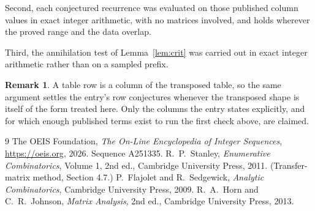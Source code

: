 \documentclass[11pt,a4paper]{article}
\theoremstyle{plain}
\theoremstyle{definition}
\newtheorem{remark}[theorem]{Remark}
\begin{document}
Second, each conjectured recurrence was evaluated on those published column values in exact
integer arithmetic, with no matrices involved, and holds wherever the proved range and the
data overlap.

Third, the annihilation test of Lemma~\ref{lem:crit} was carried out in exact integer
arithmetic rather than on a sampled prefix.

\begin{remark}
A table row is a column of the transposed table, so the same argument settles the entry's row
conjectures whenever the transposed shape is itself of the form treated here. Only the columns
the entry states explicitly, and for which enough published terms exist to run the first check
above, are claimed.
\end{remark}

\begin{thebibliography}{9}
 The OEIS Foundation, \emph{The On-Line Encyclopedia of Integer
Sequences}, \url{https://oeis.org}, 2026. Sequence A251335.
 R.~P.~Stanley, \emph{Enumerative Combinatorics}, Volume 1, 2nd ed.,
Cambridge University Press, 2011. (Transfer-matrix method, Section 4.7.)
 P.~Flajolet and R.~Sedgewick, \emph{Analytic Combinatorics}, Cambridge
University Press, 2009.
 R.~A.~Horn and C.~R.~Johnson, \emph{Matrix Analysis}, 2nd ed., Cambridge
University Press, 2013.
\end{thebibliography}
\end{document}
